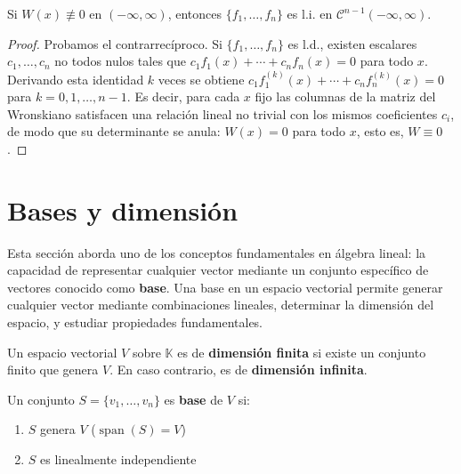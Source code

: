 \begin{theorem}
Si $W(x) \not\equiv 0$ en $(-\infty, \infty)$, entonces $\{f_1,\dots,f_n\}$ es l.i. en $\mathcal{C}^{n-1}(-\infty, \infty)$.
\begin{proof}
Probamos el contrarrecíproco. Si $\{f_1,\dots,f_n\}$ es l.d., existen escalares $c_1,\dots,c_n$ no todos nulos tales que $c_1f_1(x)+\cdots+c_nf_n(x)=0$ para todo $x$. Derivando esta identidad $k$ veces se obtiene $c_1f_1^{(k)}(x)+\cdots+c_nf_n^{(k)}(x)=0$ para $k=0,1,\dots,n-1$. Es decir, para cada $x$ fijo las columnas de la matriz del Wronskiano satisfacen una relación lineal no trivial con los mismos coeficientes $c_i$, de modo que su determinante se anula: $W(x)=0$ para todo $x$, esto es, $W \equiv 0$.
\end{proof}
\end{theorem}

 \section{Bases y dimensión}

Esta sección aborda uno de los conceptos fundamentales en álgebra lineal: la capacidad de representar cualquier vector mediante un conjunto específico de vectores conocido como \textbf{base}. Una base en un espacio vectorial permite generar cualquier vector mediante combinaciones lineales, determinar la dimensión del espacio, y estudiar propiedades fundamentales.

\begin{definition}
Un espacio vectorial $V$ sobre $\mathbb{K}$ es de \textbf{dimensión finita} si existe un conjunto finito que genera $V$. En caso contrario, es de \textbf{dimensión infinita}.
\end{definition}

\begin{definition}[Base]
Un conjunto $S = \{v_1, \dots, v_n\}$ es \textbf{base} de $V$ si:
\begin{enumerate}
\item $S$ genera $V$ ($\operatorname{span}(S) = V$)
\item $S$ es linealmente independiente
\end{enumerate} 
\end{definition}

